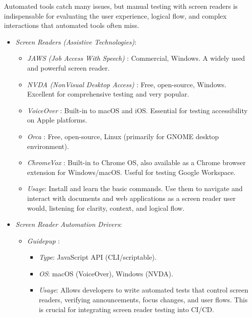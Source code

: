 Automated tools catch many issues, but manual testing with screen readers is indispensable for evaluating the user experience, logical flow, and complex interactions that automated tools often miss.

\begin{itemize}
    \item \emph{Screen Readers (Assistive Technologies)}:
        \begin{itemize}
            \item \emph{JAWS (Job Access With Speech)} \cite{jaws}: Commercial, Windows. A widely used and powerful screen reader.
            \item \emph{NVDA (NonVisual Desktop Access)} \cite{nvda}: Free, open-source, Windows. Excellent for comprehensive testing and very popular.
            \item \emph{VoiceOver} \cite{voiceover}: Built-in to macOS and iOS. Essential for testing accessibility on Apple platforms.
            \item \emph{Orca} \cite{orca}: Free, open-source, Linux (primarily for GNOME desktop environment).
            \item \emph{ChromeVox} \cite{chromevox}: Built-in to Chrome OS, also available as a Chrome browser extension for Windows/macOS. Useful for testing Google Workspace.
            \item \emph{Usage}: Install and learn the basic commands. Use them to navigate and interact with documents and web applications as a screen reader user would, listening for clarity, context, and logical flow.
        \end{itemize}
    \item \emph{Screen Reader Automation Drivers}:
        \begin{itemize}
            \item \emph{Guidepup} \cite{guidepup}:
                \begin{itemize}
                    \item \emph{Type}: JavaScript API (CLI/scriptable).
                    \item \emph{OS}: macOS (VoiceOver), Windows (NVDA).
                    \item \emph{Usage}: Allows developers to write automated tests that control screen readers, verifying announcements, focus changes, and user flows. This is crucial for integrating screen reader testing into CI/CD.
                \end{itemize}
        \end{itemize}
\end{itemize}


